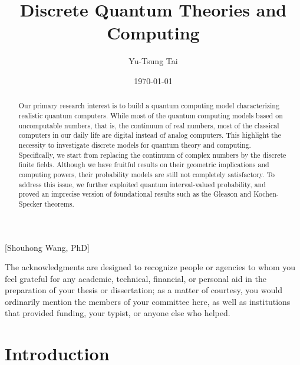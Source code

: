 \documentclass[twoside]{iuphd}
\begin{document}
\title{Discrete Quantum Theories and Computing}
\author{Yu-Tsung Tai}
\date{\today}

[Shouhong Wang, PhD]

\copyrightpage


\begin{acknowledgments}
The acknowledgments are designed to recognize people or agencies to whom you feel grateful for any academic,
technical, financial, or personal aid in the preparation of your thesis or dissertation; as a matter of
courtesy, you would ordinarily mention the members of your committee here, as well as institutions that
provided funding, your typist, or anyone else who helped.
\end{acknowledgments}


\begin{abstract}
Our primary research interest is to build a quantum computing model
characterizing realistic quantum computers. While most of the quantum
computing models based on uncomputable numbers, that is, the continuum
of real numbers, most of the classical computers in our daily life
are digital instead of analog computers. This highlight the necessity
to investigate discrete models for quantum theory and computing. Specifically,
we start from replacing the continuum of complex numbers by the discrete
finite fields. Although we have fruitful results on their geometric
implications and computing powers, their probability models are still
not completely satisfactory. To address this issue, we further exploited
quantum interval-valued probability, and proved an imprecise version
of foundational results such as the Gleason and Kochen-Specker theorems. 
\end{abstract}
\tableofcontents{}

\chapter{Introduction}
\end{document}
